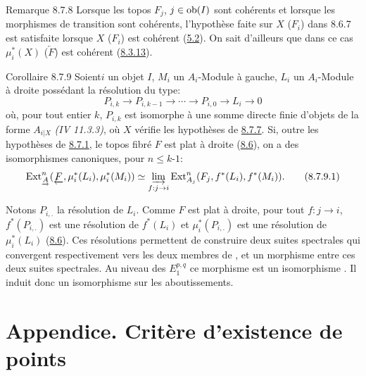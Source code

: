 \documentclass[10pt]{../fichiers-configuration-latex/smfart}
\begin{document}
\begin{enonce*}[remark]{Remarque 8.7.8}
Lorsque les topos $F_j$, $j \in \operatorname{ob} (I)$ sont cohérents et lorsque les
morphismes de transition sont cohérents, l'hypothèse faite sur $X$
(\resp $F_i$) dans 8.6.7 est satisfaite
lorsque $X$ (\resp $F_i$) est
cohérent (\hyperref[VI.cor5.2]{5.2}). On sait d'ailleurs que dans ce cas $\mu^{\ast}_i (X)$
(\resp $\underleftarrow{F}$) est cohérent (\hyperref[VI.thm8.3.13]{8.3.13}).
\end{enonce*}

\begin{enonce*}{Corollaire 8.7.9}
Soient\pageoriginale $i$ un objet $I$, $M_i$ un $A_i$-Module à gauche, $L_i$ un
$A_i$-Module à droite possédant la résolution du type:
$$
P_{i, k} \to P_{i, k-1} \to \cdots \to P_{i, 0} \to L_i \to 0
$$
où, pour tout entier $k$, $P_{i, k}$ est isomorphe à une somme directe
finie d'objets de la forme $A_{i|X}$ \emph{(IV 11.3.3)}, où $X$ vérifie les
hypothèses de \hyperref[VI.cor8.7.7]{8.7.7}. Si, outre les hypothèses de \hyperref[VI.subsubsec8.7.1]{8.7.1}, le topos fibré
$F$ est plat à droite (\hyperref[VI.subsec8.6]{8.6}), on a des isomorphismes canoniques, pour
$n \leq k$-$1$:
\begin{equation*}
\Ext^n_{\underrightarrow{A}}(\underleftarrow{F}, \mu^{\ast}_i(L_i),
\mu^{\ast}_i (M_i)) \simeq \varinjlim_{f : j \to i}
\Ext^{n}_{A_j} (F_j, f^{\ast}(L_i), f^{\ast} (M_i)){\quoi}.\tag{8.7.9.1}
\end{equation*}
\end{enonce*}

\noindent
Notons $P_{i,.}$ la résolution de $L_i$. Comme $F$ est plat à
droite, pour tout $f : j \to i$, $f^{\ast}(P_{i,.})$ est une
résolution de $f^{\ast}(L_i)$ et $\mu^{\ast}_i(P_{i,.})$ est une
  résolution de $\mu^{\ast}_i(L_i)$ (\hyperref[VI.subsec8.6]{8.6}). Ces résolutions permettent
  de construire deux suites spectrales qui convergent respectivement
  vers les deux membres de , et un morphisme entre ces deux
  suites spectrales. Au niveau des $E^{p, q}_1$ ce morphisme est un
  isomorphisme . Il induit donc un isomorphisme sur les
  aboutissements.

\section{Appendice. Critère d'existence de points}
\end{document}
